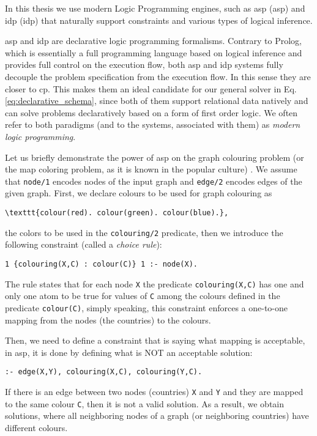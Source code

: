 In this thesis we use modern Logic Programming engines, such
as \acrlong{asp} (\acrshort{asp}) \parencite{ASPbook,whatisasp} and
\acrlong{idp} (\acrshort{idp})
\parencite{idp} %
that naturally support constraints and various types of logical
inference.

\pubrev
\acrshort{asp} and \acrshort{idp} are declarative logic programming
formalisms. Contrary to Prolog, which is essentially a full
programming language based on logical inference and provides full
control on the execution flow,  both \acrshort{asp} and \acrshort{idp}
systems fully decouple the problem specification from the execution
flow. In this sense they are closer to \acrlong{cp}. This makes them
an ideal candidate for our general solver in Eq. 
\ref{eq:declarative_schema}, since both of them support relational
data natively and can solve problems declaratively based on a form of
first order logic. We often refer to both paradigms (and to the systems,
associated with them) as \textit{modern logic programming}.

Let us briefly demonstrate the power of \acrshort{asp} on the graph
colouring problem (or the map coloring problem, as it is known in the popular culture) \parencite{ASPbook}. We assume that \texttt{node/1} encodes nodes of the input graph and \texttt{edge/2} encodes edges of the given graph. First, we declare colours to be used for graph colouring as 
\begin{verbatim}
\texttt{colour(red). colour(green). colour(blue).}, 
\end{verbatim}
the colors to be used in the \texttt{colouring/2} predicate, then we introduce the following constraint (called a \textit{choice rule}):
\begin{verbatim}
1 {colouring(X,C) : colour(C)} 1 :- node(X).
\end{verbatim}
The rule states that for each node \texttt{X} the predicate \texttt{colouring(X,C)} has one and only one atom to be true for values of \texttt{C} among the colours defined in the predicate \texttt{colour(C)}, simply speaking, this constraint enforces a one-to-one mapping from the nodes (the countries) to the colours.

Then, we need to define a constraint that is saying what mapping is acceptable, in \acrshort{asp}, it is done by defining what is NOT an acceptable solution:
\begin{verbatim}
:- edge(X,Y), colouring(X,C), colouring(Y,C).
\end{verbatim}
If there is an edge between two nodes (countries) \texttt{X} and \texttt{Y} and they are mapped to the same colour \texttt{C}, then it is not a valid solution. As a result, we obtain solutions, where all neighboring nodes of a graph (or neighboring countries) have different colours.
\pubrevend

